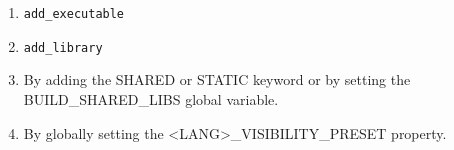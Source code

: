 

\begin{enumerate}
\item 
\begin{lstlisting}[style=styleCMake]
add_executable
\end{lstlisting}

\item 
\begin{lstlisting}[style=styleCMake]
add_library
\end{lstlisting}

\item 
By adding the SHARED or STATIC keyword or by setting the BUILD\_SHARED\_LIBS global variable.

\item 
By globally setting the <LANG>\_VISIBILITY\_PRESET property.
\end{enumerate}